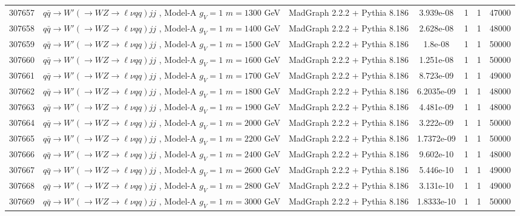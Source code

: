 \begin{landscape}
\begin{table}[!htb]
\begin{footnotesize}
\begin{center}
\begin{tabular}{|c|l|c|c|c|c|r|}
					307657 & $q\bar{q} \to W'\left(\to WZ \to \ell\nu qq\right) jj$ , Model-A $g_V=1$ $m=1300$ GeV& MadGraph 2.2.2 + Pythia 8.186 & 3.939e-08 & 1 & 1 & 47000 \\
					307658 & $q\bar{q} \to W'\left(\to WZ \to \ell\nu qq\right) jj$ , Model-A $g_V=1$ $m=1400$ GeV& MadGraph 2.2.2 + Pythia 8.186 & 2.628e-08 & 1 & 1 & 48000 \\
					307659 & $q\bar{q} \to W'\left(\to WZ \to \ell\nu qq\right) jj$ , Model-A $g_V=1$ $m=1500$ GeV& MadGraph 2.2.2 + Pythia 8.186 & 1.8e-08 & 1 & 1 & 50000 \\
					307660 & $q\bar{q} \to W'\left(\to WZ \to \ell\nu qq\right) jj$ , Model-A $g_V=1$ $m=1600$ GeV& MadGraph 2.2.2 + Pythia 8.186 & 1.251e-08 & 1 & 1 & 50000 \\
					307661 & $q\bar{q} \to W'\left(\to WZ \to \ell\nu qq\right) jj$ , Model-A $g_V=1$ $m=1700$ GeV& MadGraph 2.2.2 + Pythia 8.186 & 8.723e-09 & 1 & 1 & 49000 \\
					307662 & $q\bar{q} \to W'\left(\to WZ \to \ell\nu qq\right) jj$ , Model-A $g_V=1$ $m=1800$ GeV& MadGraph 2.2.2 + Pythia 8.186 & 6.2035e-09 & 1 & 1 & 48000 \\
					307663 & $q\bar{q} \to W'\left(\to WZ \to \ell\nu qq\right) jj$ , Model-A $g_V=1$ $m=1900$ GeV& MadGraph 2.2.2 + Pythia 8.186 & 4.481e-09 & 1 & 1 & 48000 \\
					307664 & $q\bar{q} \to W'\left(\to WZ \to \ell\nu qq\right) jj$ , Model-A $g_V=1$ $m=2000$ GeV& MadGraph 2.2.2 + Pythia 8.186 & 3.222e-09 & 1 & 1 & 50000 \\
					307665 & $q\bar{q} \to W'\left(\to WZ \to \ell\nu qq\right) jj$ , Model-A $g_V=1$ $m=2200$ GeV& MadGraph 2.2.2 + Pythia 8.186 & 1.7372e-09 & 1 & 1 & 50000 \\
					307666 & $q\bar{q} \to W'\left(\to WZ \to \ell\nu qq\right) jj$ , Model-A $g_V=1$ $m=2400$ GeV& MadGraph 2.2.2 + Pythia 8.186 & 9.602e-10 & 1 & 1 & 48000 \\
					307667 & $q\bar{q} \to W'\left(\to WZ \to \ell\nu qq\right) jj$ , Model-A $g_V=1$ $m=2600$ GeV& MadGraph 2.2.2 + Pythia 8.186 & 5.446e-10 & 1 & 1 & 49000 \\
					307668 & $q\bar{q} \to W'\left(\to WZ \to \ell\nu qq\right) jj$ , Model-A $g_V=1$ $m=2800$ GeV& MadGraph 2.2.2 + Pythia 8.186 & 3.131e-10 & 1 & 1 & 49000 \\
					307669 & $q\bar{q} \to W'\left(\to WZ \to \ell\nu qq\right) jj$ , Model-A $g_V=1$ $m=3000$ GeV& MadGraph 2.2.2 + Pythia 8.186 & 1.8333e-10 & 1 & 1 & 50000 \\

\end{tabular}
\end{center}
\end{footnotesize}
\end{table}
\end{landscape}
